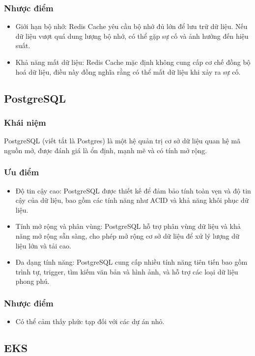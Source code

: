 \subsubsection{Nhược điểm}
\begin{itemize}
    \item Giới hạn bộ nhớ: Redis Cache yêu cầu bộ nhớ đủ lớn để lưu trữ dữ liệu. Nếu dữ liệu vượt quá dung lượng bộ nhớ, có thể gặp sự cố và ảnh hưởng đến hiệu suất.
    \item Khả năng mất dữ liệu: Redis Cache mặc định không cung cấp cơ chế đồng bộ hoá dữ liệu, điều này đồng nghĩa rằng có thể mất dữ liệu khi xảy ra sự cố.
\end{itemize}
\subsection{PostgreSQL}
\subsubsection{Khái niệm}
\indent PostgreSQL (viết tắt là Postgres) là một hệ quản trị cơ sở dữ liệu quan hệ mã nguồn mở, được đánh giá là ổn định, mạnh mẽ và có tính mở rộng.
\subsubsection{Ưu điểm}
\begin{itemize}
    \item Độ tin cậy cao: PostgreSQL được thiết kế để đảm bảo tính toàn vẹn và độ tin cậy của dữ liệu, bao gồm các tính năng như ACID và khả năng khôi phục dữ liệu.
    \item Tính mở rộng và phân vùng: PostgreSQL hỗ trợ phân vùng dữ liệu và khả năng mở rộng sẵn sàng, cho phép mở rộng cơ sở dữ liệu để xử lý lượng dữ liệu lớn và tải cao.
    \item Đa dạng tính năng: PostgreSQL cung cấp nhiều tính năng tiên tiến bao gồm trình tự, trigger, tìm kiếm văn bản và hình ảnh, và hỗ trợ các loại dữ liệu phong phú.
\end{itemize}
\subsubsection{Nhược điểm}
\begin{itemize}
    \item Có thể cảm thấy phức tạp đối với các dự án nhỏ.
\end{itemize}
\subsection{EKS}
